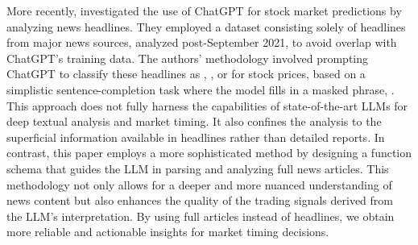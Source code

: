 More recently, \cite{lopez2023can} investigated the use of ChatGPT for stock market predictions by analyzing news headlines. They employed a dataset consisting solely of headlines from major news sources, analyzed post-September 2021, to avoid overlap with ChatGPT's training data. 
The authors' methodology involved prompting ChatGPT to classify these headlines as , , or  for stock prices, based on a simplistic sentence-completion task where the model fills in a masked phrase, . This approach does not fully harness the capabilities of state-of-the-art LLMs for deep textual analysis and market timing. It also confines the analysis to the superficial information available in headlines rather than detailed reports. In contrast, this paper employs a more sophisticated method by designing a function schema that guides the LLM in parsing and analyzing full news articles. This methodology not only allows for a deeper and more nuanced understanding of news content but also enhances the quality of the trading signals derived from the LLM's interpretation. By using full articles instead of headlines, we obtain more reliable and actionable insights for market timing decisions.


\mx 


